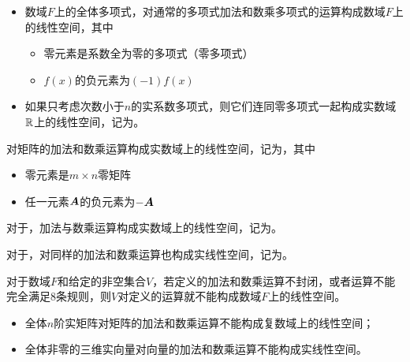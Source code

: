 \begin{frame}
  \begin{li} 
	\begin{itemize}
	\item 数域$F$上的全体多项式，对通常的多项式加法和数乘多项式的运算构成数域$F$上的线性空间，其中\\[0.15in]
	\begin{itemize}
		\item 零元素是系数全为零的多项式（零多项式）\\[0.15in]
		\item $f(x)$的负元素为$(-1)f(x)$\\[0.15in]
	\end{itemize}\pause
	\item 如果只考虑次数小于$n$的实系数多项式，则它们连同零多项式一起构成实数域$\mathbb{R}$上的线性空间，记为。
	\end{itemize}
     
  \end{li}
\end{frame}

\begin{frame}
  \begin{li} 

    对矩阵的加法和数乘运算构成实数域上的线性空间，记为，其中
    \begin{itemize}
      \item 零元素是$m\times n$零矩阵
      \item 任一元素$\boldsymbol{A}$的负元素为$-\boldsymbol{A}$
    \end{itemize}
  \end{li} 
\end{frame}

\begin{frame}
  \begin{li}

    对于，加法与数乘运算构成实数域上的线性空间，记为。  


    对于，对同样的加法和数乘运算也构成实线性空间，记为。
  \end{li} 
\end{frame}

\begin{frame}
  对于数域$F$和给定的非空集合$V$，若定义的加法和数乘运算不封闭，或者运算不能完全满足$8$条规则，则$V$对定义的运算就不能构成数域$F$上的线性空间。

  \begin{li}
    \begin{itemize}
      \item 全体$n$阶实矩阵对矩阵的加法和数乘运算不能构成复数域上的线性空间；

      \item 全体非零的三维实向量对向量的加法和数乘运算不能构成实线性空间。
    \end{itemize}
  \end{li}
\end{frame}

